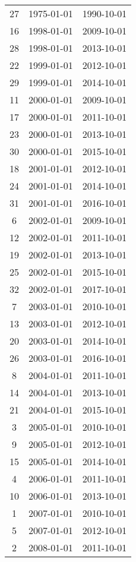 % 
\begin{tabular}{ccc}
  \hline
  \hline
27 & 1975-01-01 & 1990-10-01 \\ 
  16 & 1998-01-01 & 2009-10-01 \\ 
  28 & 1998-01-01 & 2013-10-01 \\ 
  22 & 1999-01-01 & 2012-10-01 \\ 
  29 & 1999-01-01 & 2014-10-01 \\ 
  11 & 2000-01-01 & 2009-10-01 \\ 
  17 & 2000-01-01 & 2011-10-01 \\ 
  23 & 2000-01-01 & 2013-10-01 \\ 
  30 & 2000-01-01 & 2015-10-01 \\ 
  18 & 2001-01-01 & 2012-10-01 \\ 
  24 & 2001-01-01 & 2014-10-01 \\ 
  31 & 2001-01-01 & 2016-10-01 \\ 
  6 & 2002-01-01 & 2009-10-01 \\ 
  12 & 2002-01-01 & 2011-10-01 \\ 
  19 & 2002-01-01 & 2013-10-01 \\ 
  25 & 2002-01-01 & 2015-10-01 \\ 
  32 & 2002-01-01 & 2017-10-01 \\ 
  7 & 2003-01-01 & 2010-10-01 \\ 
  13 & 2003-01-01 & 2012-10-01 \\ 
  20 & 2003-01-01 & 2014-10-01 \\ 
  26 & 2003-01-01 & 2016-10-01 \\ 
  8 & 2004-01-01 & 2011-10-01 \\ 
  14 & 2004-01-01 & 2013-10-01 \\ 
  21 & 2004-01-01 & 2015-10-01 \\ 
  3 & 2005-01-01 & 2010-10-01 \\ 
  9 & 2005-01-01 & 2012-10-01 \\ 
  15 & 2005-01-01 & 2014-10-01 \\ 
  4 & 2006-01-01 & 2011-10-01 \\ 
  10 & 2006-01-01 & 2013-10-01 \\ 
  1 & 2007-01-01 & 2010-10-01 \\ 
  5 & 2007-01-01 & 2012-10-01 \\ 
  2 & 2008-01-01 & 2011-10-01 \\ 
   \hline
\end{tabular}
